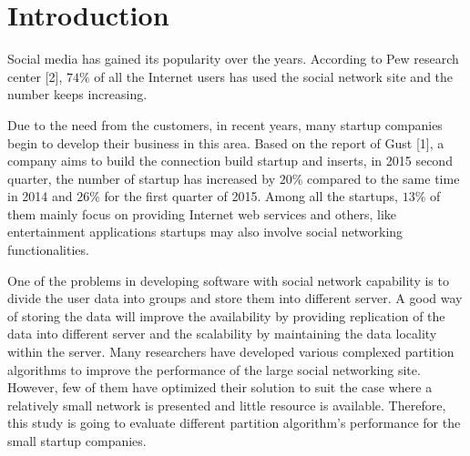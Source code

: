 \section{Introduction}

Social media has gained its popularity over the years. According to Pew research center [2], $74\%$ of all the Internet users has used the social network site and the number keeps increasing. 

Due to the need from the customers, in recent years, many startup companies begin to develop their business in this area. Based on the report of Gust [1], a company aims to build the connection build startup and inserts, in 2015 second quarter, the number of startup has increased by $20\%$ compared to the same time in 2014 and $26\%$ for the first quarter of 2015. Among all the startups, $13\%$ of them mainly focus on providing Internet web services and others, like entertainment applications startups may also involve social networking functionalities. 

One of the problems in developing software with social network capability is to divide the user data into groups and store them into different server. A good way of storing the data will improve the availability by providing replication of the data into different server and the scalability by maintaining the data locality within the server. Many researchers have developed various complexed partition algorithms to improve the performance of the large social networking site. However, few of them have optimized their solution to suit the case where a relatively small network is presented and little resource is available. Therefore, this study is going to evaluate different partition algorithm’s performance for the small startup companies.